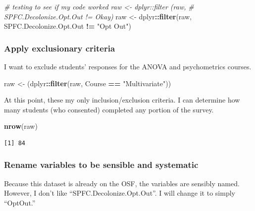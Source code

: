 \documentclass[
  11pt,
]{book}
\newenvironment{Shaded}{\begin{snugshade}}{\end{snugshade}}
\newcommand{\CommentTok}[1]{\textcolor[rgb]{0.37,0.37,0.37}{\textit{#1}}}
\newcommand{\FunctionTok}[1]{\textcolor[rgb]{0.27,0.27,0.27}{\textbf{#1}}}
\newcommand{\NormalTok}[1]{#1}
\newcommand{\OtherTok}[1]{\textcolor[rgb]{0.37,0.37,0.37}{#1}}
\newcommand{\SpecialCharTok}[1]{\textcolor[rgb]{0.43,0.43,0.43}{\textbf{#1}}}
\newcommand{\StringTok}[1]{\textcolor[rgb]{0.5,0.5,0.5}{#1}}
\begin{document}
\begin{Shaded}
\begin{Highlighting}[]
\CommentTok{\# testing to see if my code worked raw \textless{}{-} dplyr::filter (raw,}
\CommentTok{\# SPFC.Decolonize.Opt.Out != \textquotesingle{}Okay\textquotesingle{})}
\NormalTok{raw }\OtherTok{\textless{}{-}}\NormalTok{ dplyr}\SpecialCharTok{::}\FunctionTok{filter}\NormalTok{(raw, SPFC.Decolonize.Opt.Out }\SpecialCharTok{!=} \StringTok{"Opt Out"}\NormalTok{)}
\end{Highlighting}
\end{Shaded}

\hypertarget{apply-exclusionary-criteria}{%
\subsubsection*{Apply exclusionary criteria}\label{apply-exclusionary-criteria}}


I want to exclude students' responses for the ANOVA and psychometrics courses.

\begin{Shaded}
\begin{Highlighting}[]
\NormalTok{raw }\OtherTok{\textless{}{-}}\NormalTok{ (dplyr}\SpecialCharTok{::}\FunctionTok{filter}\NormalTok{(raw, Course }\SpecialCharTok{==} \StringTok{"Multivariate"}\NormalTok{))}
\end{Highlighting}
\end{Shaded}

At this point, these my only inclusion/exclusion criteria. I can determine how many students (who consented) completed any portion of the survey.

\begin{Shaded}
\begin{Highlighting}[]
\FunctionTok{nrow}\NormalTok{(raw)}
\end{Highlighting}
\end{Shaded}

\begin{verbatim}
[1] 84
\end{verbatim}

\hypertarget{rename-variables-to-be-sensible-and-systematic}{%
\subsubsection*{Rename variables to be sensible and systematic}\label{rename-variables-to-be-sensible-and-systematic}}


Because this dataset is already on the OSF, the variables are sensibly named. However, I don't like ``SPFC.Decolonize.Opt.Out''. I will change it to simply ``OptOut.''
\end{document}
